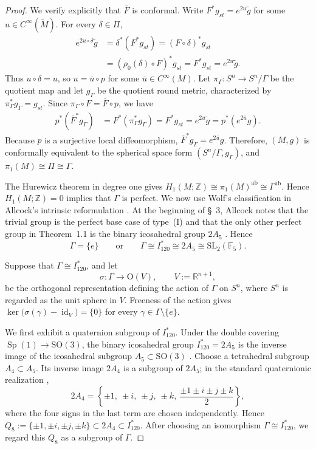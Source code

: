 \documentclass[12pt,oneside,a4paper]{article}
\theoremstyle{mytheorem}
\theoremstyle{remark}
\theoremstyle{definition}
\begin{document}
\begin{proof}
We verify explicitly that \(\overline F\) is conformal. Write
\(F^*g_{st}=e^{2u}\widetilde g\) for some
\(u\in C^\infty(\widetilde M)\). For every \(\delta\in\Pi\),
\[
\begin{aligned}
e^{2u\circ\delta}\widetilde g
 &=\delta^*(F^*g_{st})
  =(F\circ\delta)^*g_{st} \\
 &=(\rho_0(\delta)\circ F)^*g_{st}
  =F^*g_{st}
  =e^{2u}\widetilde g .
\end{aligned}
\]
Thus \(u\circ\delta=u\), so \(u=\overline u\circ p\) for some
\(\overline u\in C^\infty(M)\). Let
\(\pi_\Gamma\colon S^n\to S^n/\Gamma\) be the quotient map and let
\(g_\Gamma\) be the quotient round metric, characterized by
\(\pi_\Gamma^*g_\Gamma=g_{st}\). Since
\(\pi_\Gamma\circ F=\overline F\circ p\), we have
\[
\begin{aligned}
p^*(\overline F^*g_\Gamma)
 &=F^*(\pi_\Gamma^*g_\Gamma)
  =F^*g_{st}
  =e^{2u}\widetilde g
  =p^*(e^{2\overline u}g).
\end{aligned}
\]
Because \(p\) is a surjective local diffeomorphism,
\(\overline F^*g_\Gamma=e^{2\overline u}g\).
Therefore, \((M,g)\) is conformally equivalent to the spherical space form
\((S^n/\Gamma,g_\Gamma)\), and
\(\pi_1(M)\cong\Pi\cong\Gamma\).

The Hurewicz theorem in degree one gives
\(H_1(M;\mathbb Z)\cong\pi_1(M)^{\mathrm{ab}}\cong\Gamma^{\mathrm{ab}}\).
Hence \(H_1(M;\mathbb Z)=0\) implies that \(\Gamma\) is perfect. We now use
Wolf's classification in Allcock's intrinsic reformulation
\cite[Theorem~1.1 and Remark~1.3, pp.~5563--5564]{zbMATH06871580}.
At the beginning of \S~3, Allcock notes that the trivial group is the perfect
base case of type~(I) and that the only other perfect group in
Theorem~1.1 is the binary icosahedral group \(2A_5\)
\cite[p.~5569]{zbMATH06871580}. Hence
\[
\Gamma=\{e\}
\qquad\text{or}\qquad
\Gamma\cong I_{120}^*\cong2A_5
\cong\mathrm{SL}_2(\mathbb F_5).
\]


Suppose that \(\Gamma\cong I_{120}^*\), and let
\[
\sigma\colon\Gamma\longrightarrow\mathrm O(V),
\qquad V:=\mathbb R^{n+1},
\]
be the orthogonal representation defining the action of \(\Gamma\) on
\(S^n\), where \(S^n\) is regarded as the unit sphere in \(V\). Freeness of
the action gives
\(\ker\bigl(\sigma(\gamma)-\operatorname{id}_V\bigr)=\{0\}\)
for every \(\gamma\in\Gamma\setminus\{e\}\).

We first exhibit a quaternion subgroup of \(I_{120}^*\). Under the double covering
\(\operatorname{Sp}(1)\to\mathrm{SO}(3)\), the binary icosahedral group
\(I_{120}^*=2A_5\) is the inverse image of the icosahedral subgroup
\(A_5\subset\mathrm{SO}(3)\)
\cite[p.~5563]{zbMATH06871580}. Choose a tetrahedral subgroup
\(A_4\subset A_5\). Its inverse image \(2A_4\) is a subgroup of \(2A_5\);
in the standard quaternionic realization
\cite[(3.1), p.~5573]{zbMATH06871580},
\[
2A_4=
\left\{
 \pm1,\ \pm i,\ \pm j,\ \pm k,\
 \frac{\pm1\pm i\pm j\pm k}{2}
\right\},
\]
where the four signs in the last term are chosen independently. Hence
\(Q_8:=\{\pm1,\pm i,\pm j,\pm k\}\subset2A_4\subset I_{120}^*\).
After choosing an isomorphism \(\Gamma\cong I_{120}^*\), we regard this
\(Q_8\) as a subgroup of \(\Gamma\).


\end{proof}
\end{document}
